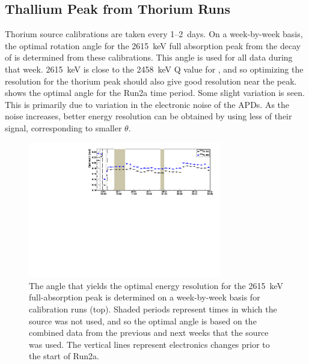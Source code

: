 \documentclass[herrin-thesis.tex]{subfiles}
\begin{document}
\subsection{Thallium Peak from Thorium Runs}
Thorium source calibrations are taken every 1--2~days. On a week-by-week basis, the optimal rotation angle for the \SI{2615}{\keV} full absorption peak from the decay of  is determined from these calibrations. This angle is used for all data during that week. \SI{2615}{\keV} is close to the \SI{2458}{\keV} Q value for , and so optimizing the resolution for the thorium peak should also give good resolution near the \zeronu{} peak.  shows the optimal angle for the Run2a time period. Some slight variation is seen. This is primarily due to variation in the electronic noise of the APDs. As the noise increases, better energy resolution can be obtained by using less of their signal, corresponding to smaller \(\theta\).

\begin{figure}[htbp]
\centering
	\includegraphics[width=0.75\textwidth]{./plots/data_theta_v_time.pdf}
	\caption[Variation of the optimal rotation angle over time]{The angle that yields the optimal energy resolution for the \SI{2615}{\keV} full-absorption peak is determined on a week-by-week basis for  calibration runs (top). Shaded periods represent times in which the  source was not used, and so the optimal angle is based on the combined data from the previous and next weeks that the  source was used. The vertical lines represent electronics changes prior to the start of Run2a.}
	\label{fig:data_theta_v_time}
\end{figure}
\end{document}

